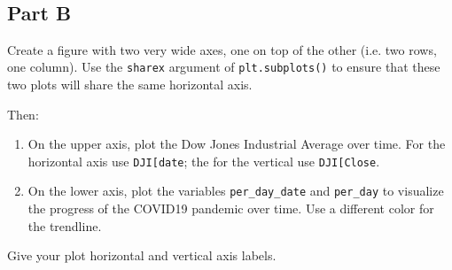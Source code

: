 \documentclass[11pt]{article}
\providecommand{\tightlist}{%
      \setlength{\itemsep}{0pt}\setlength{\parskip}{0pt}}
\begin{document}
    \begin{center}
    \end{center}
    { \hspace*{\fill} \\}
    
    \subsection{Part B}\label{part-b}

Create a figure with two very wide axes, one on top of the other (i.e.
two rows, one column). Use the \texttt{sharex} argument of
\texttt{plt.subplots()} to ensure that these two plots will share the
same horizontal axis.

Then:

\begin{enumerate}
\def\labelenumi{\arabic{enumi}.}
\tightlist
\item
  On the upper axis, plot the Dow Jones Industrial Average over time.
  For the horizontal axis use
  \texttt{DJI{[}\textquotesingle{}date\textquotesingle{}{]}}; the for
  the vertical use
  \texttt{DJI{[}\textquotesingle{}Close\textquotesingle{}{]}}.
\item
  On the lower axis, plot the variables \texttt{per\_day\_date} and
  \texttt{per\_day} to visualize the progress of the COVID19 pandemic
  over time. Use a different color for the trendline.
\end{enumerate}

Give your plot horizontal and vertical axis labels.
\end{document}
